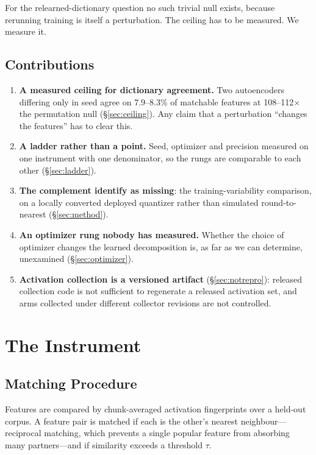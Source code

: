\documentclass[11pt,a4paper]{article}
\begin{document}
For the relearned-dictionary question no such trivial null exists, because rerunning
training is itself a perturbation. The ceiling has to be measured. We measure it.

\subsection{Contributions}

\begin{enumerate}
  \item \textbf{A measured ceiling for dictionary agreement.} Two autoencoders
    differing only in seed agree on 7.9--8.3\% of matchable features at
    108--112$\times$ the permutation null (\S\ref{sec:ceiling}). Any claim that a
    perturbation ``changes the features'' has to clear this.
  \item \textbf{A ladder rather than a point.} Seed, optimizer and precision measured
    on one instrument with one denominator, so the rungs are comparable to each other
    (\S\ref{sec:ladder}).
  \item \textbf{The complement \citeauthor{duan2026quant} identify as missing}: the
    training-variability comparison, on a locally converted deployed quantizer rather
    than simulated round-to-nearest (\S\ref{sec:method}).
  \item \textbf{An optimizer rung nobody has measured.} Whether the choice of optimizer
    changes the learned decomposition is, as far as we can determine, unexamined
    (\S\ref{sec:optimizer}).
  \item \textbf{Activation collection is a versioned artifact}
    (\S\ref{sec:notrepro}): released collection code is not sufficient to regenerate a
    released activation set, and arms collected under different collector revisions are
    not controlled.
\end{enumerate}

\section{The Instrument}
\label{sec:instrument}

\subsection{Matching Procedure}

Features are compared by chunk-averaged activation fingerprints over a held-out corpus.
A feature pair is matched if each is the other's nearest neighbour---reciprocal
matching, which prevents a single popular feature from absorbing many partners---and if
similarity exceeds a threshold $\tau$.
\end{document}
